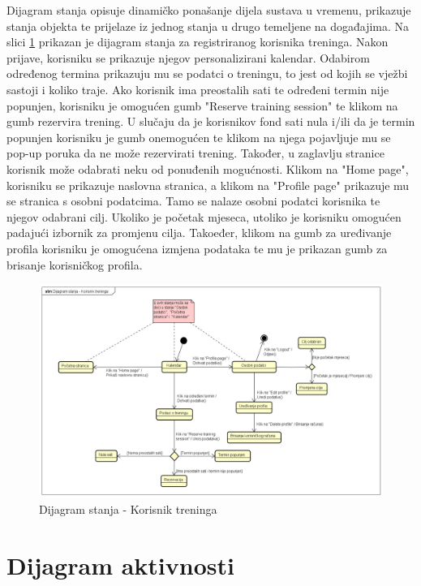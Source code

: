 {{{{{{			{Dijagram stanja opisuje dinamičko ponašanje dijela sustava u vremenu, prikazuje stanja objekta te prijelaze iz jednog stanja u drugo temeljene na događajima. Na slici \ref {fig:dijagramstanja} prikazan je dijagram stanja za registriranog korisnika treninga. Nakon prijave, korisniku se prikazuje njegov personalizirani kalendar. Odabirom određenog termina prikazuju mu se podatci o treningu, to jest od kojih se vježbi sastoji i koliko traje. Ako korisnik ima preostalih sati te određeni termin nije popunjen, korisniku je omogućen gumb "Reserve training session" te klikom na gumb rezervira trening. U slučaju da je korisnikov fond sati nula i/ili da je termin popunjen korisniku je gumb onemogućen te klikom na njega pojavljuje mu se pop-up poruka da ne može rezervirati trening. Također, u zaglavlju stranice korisnik može odabrati neku od ponuđenih mogućnosti. Klikom na "Home page", korisniku se prikazuje naslovna stranica, a klikom na "Profile page" prikazuje mu se stranica s osobni podatcima. Tamo se nalaze osobni podatci korisnika te njegov odabrani cilj. Ukoliko je početak mjeseca, utoliko je korisniku omogućen padajući izbornik za promjenu cilja. Takoeđer, klikom na gumb za uređivanje profila korisniku je omogućena izmjena podataka te mu je prikazan gumb za brisanje korisničkog profila. }
			
			\begin{figure}[H]
				\includegraphics[scale=0.4]{dijagrami/Dijagram stanja - Korisnik treninga.png} %
				\centering
				\caption{Dijagram stanja - Korisnik treninga}
				\label{fig:dijagramstanja}
			\end{figure}
			\eject 
		
		\section{Dijagram aktivnosti}
			 
}}}}}}

